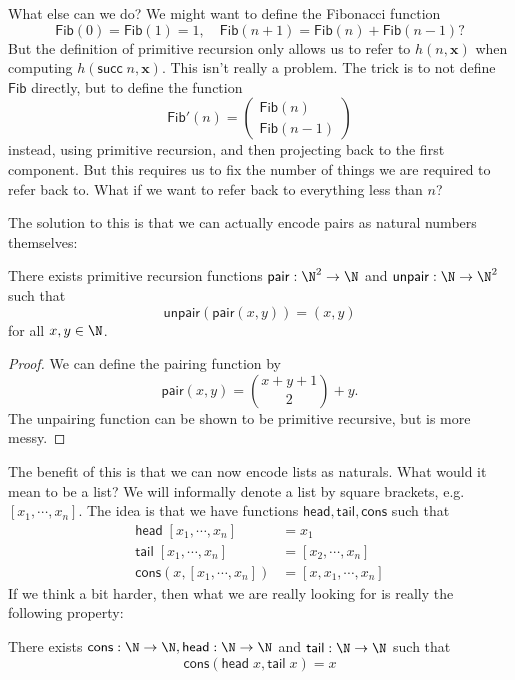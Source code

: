 \documentclass[a4paper]{article}
\newcommand\head{\mathsf{head}}
\newcommand\tail{\mathsf{tail}}
\newcommand\pair{\mathsf{pair}}
\newcommand\unpair{\mathsf{unpair}}
\renewcommand\succ{\mathsf{succ}}
\newcommand\cons{\mathsf{cons}}
\begin{document}
What else can we do? We might want to define the Fibonacci function
\[
  \mathsf{Fib}(0) = \mathsf{Fib}(1) = 1, \quad \mathsf{Fib}(n + 1) = \mathsf{Fib}(n) + \mathsf{Fib}(n - 1)?
\]
But the definition of primitive recursion only allows us to refer to $h(n, \mathbf{x})$ when computing $h(\succ \; n, \mathbf{x})$. This isn't really a problem. The trick is to not define $\mathsf{Fib}$ directly, but to define the function
\[
  \mathsf{Fib}' (n) =
  \begin{pmatrix}
  \mathsf{Fib} (n)\\
  \mathsf{Fib} (n - 1)
  \end{pmatrix}
\]
instead, using primitive recursion, and then projecting back to the first component. But this requires us to fix the number of things we are required to refer back to. What if we want to refer back to everything less than $n$?

The solution to this is that we can actually encode pairs as natural numbers themselves:
\begin{prop}
  There exists primitive recursion functions $\pair: \N^2 \to \N$ and $\unpair: \N \to \N^2$ such that
  \[
    \unpair (\pair(x, y)) = (x, y)
  \]
  for all $x, y \in \N$.
\end{prop}

\begin{proof}
  We can define the pairing function by
  \[
    \pair(x, y) = \binom{x + y + 1}{2} + y.
  \]
  The unpairing function can be shown to be primitive recursive, but is more messy.
\end{proof}

The benefit of this is that we can now encode lists as naturals. What would it mean to be a list? We will informally denote a list by square brackets, e.g.\ $[x_1, \cdots, x_n]$. The idea is that we have functions $\head, \tail, \cons$ such that
\begin{align*}
  \head\; [x_1, \cdots, x_n] &= x_1\\
  \tail\; [x_1, \cdots, x_n] &= [x_2, \cdots, x_n]\\
  \cons (x, [x_1, \cdots, x_n]) &= [x, x_1, \cdots, x_n]
\end{align*}
If we think a bit harder, then what we are really looking for is really the following property:
\begin{cor}
  There exists $\cons : \N \to \N, \head: \N \to \N$ and $\tail: \N \to \N$ such that
  \[
    \cons (\head \;x, \tail \;x) = x
  \]
\end{cor}
\end{document}

